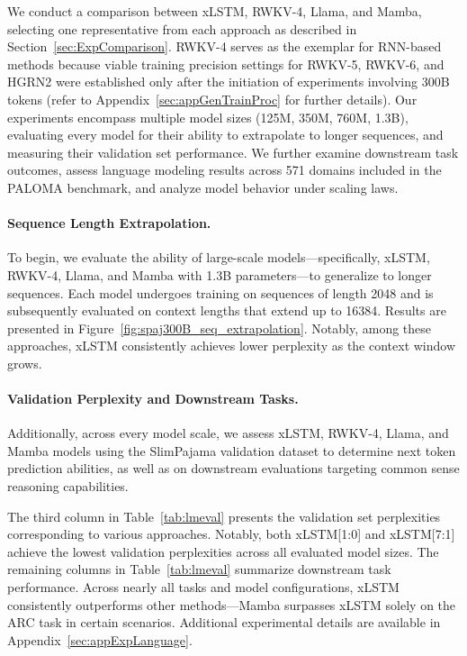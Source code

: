 We conduct a comparison between xLSTM, RWKV-4, Llama, and Mamba, selecting one representative from each approach as described in Section~\ref{sec:ExpComparison}. RWKV-4 serves as the exemplar for RNN-based methods because viable training precision settings for RWKV-5, RWKV-6, and HGRN2 were established only after the initiation of experiments involving 300B tokens (refer to Appendix~\ref{sec:appGenTrainProc} for further details). Our experiments encompass multiple model sizes (125M, 350M, 760M, 1.3B), evaluating every model for their ability to extrapolate to longer sequences, and measuring their validation set performance. We further examine downstream task outcomes, assess language modeling results across 571 domains included in the PALOMA benchmark, and analyze model behavior under scaling laws.

\paragraph{Sequence Length Extrapolation.}
\label{sec:spaj300B_ctx_extrapolation}
To begin, we evaluate the ability of large-scale models—specifically, xLSTM, RWKV-4, Llama, and Mamba with 1.3B parameters—to generalize to longer sequences. Each model undergoes training on sequences of length 2048 and is subsequently evaluated on context lengths that extend up to 16384. Results are presented in Figure~\ref{fig:spaj300B_seq_extrapolation}. Notably, among these approaches, xLSTM consistently achieves lower perplexity as the context window grows.

\paragraph{Validation Perplexity and Downstream Tasks.}
\label{sec:spaj_downstream_eval}
Additionally, across every model scale, we assess xLSTM, RWKV-4, Llama, and Mamba models using the SlimPajama validation dataset to determine next token prediction abilities, as well as on downstream evaluations targeting common sense reasoning capabilities.

The third column in Table~\ref{tab:lmeval} presents the validation set perplexities corresponding to various approaches. Notably, both xLSTM[1:0] and xLSTM[7:1] achieve the lowest validation perplexities across all evaluated model sizes. The remaining columns in Table~\ref{tab:lmeval} summarize downstream task performance. Across nearly all tasks and model configurations, xLSTM consistently outperforms other methods—Mamba surpasses xLSTM solely on the ARC task in certain scenarios. Additional experimental details are available in Appendix~\ref{sec:appExpLanguage}.

